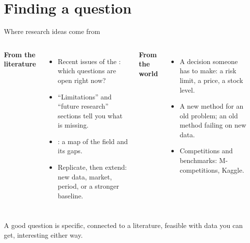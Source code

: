 \documentclass[aspectratio=169,11pt,t]{beamer}
\begin{document}
\section{Finding a question}

\begin{frame}{Where research ideas come from}
  \begin{columns}[T,onlytextwidth]
    \textbf{From the literature}
    \begin{itemize}
      \item Recent issues of the : which questions are open right now?
      \item ``Limitations'' and ``future research'' sections tell you what is missing.
      \item {}: a map of the field and its gaps.
      \item Replicate, then extend: new data, market, period, or a stronger baseline.
    \end{itemize}
    \textbf{From the world}
    \begin{itemize}
      \item A decision someone has to make: a risk limit, a price, a stock level.
      \item A new method for an old problem; an old method failing on new data.
      \item Competitions and benchmarks: M-competitions, Kaggle.
    \end{itemize}
  \end{columns}

  \begin{block}{A good question is}
    \small specific, connected to a literature, feasible with data you can get, interesting either way.
  \end{block}
\end{frame}
\end{document}
